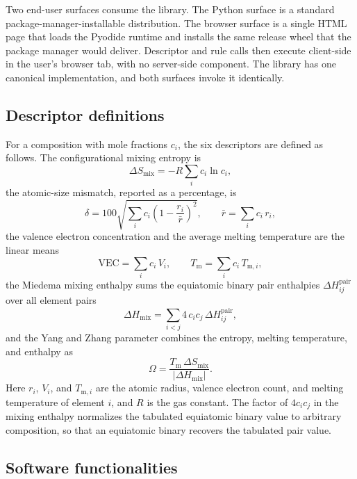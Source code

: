 \documentclass[review,times,nonatbib]{elsarticle}
\newcommand{\Smix}{\ensuremath{\Delta S_{\mathrm{mix}}}}
\newcommand{\Hmix}{\ensuremath{\Delta H_{\mathrm{mix}}}}
\newcommand{\Tm}{\ensuremath{T_{\mathrm{m}}}}
\newcommand{\Omegaparam}{\ensuremath{\Omega}}
\begin{document}
Two end-user surfaces consume the library. The Python surface is a
standard package-manager-installable distribution. The browser
surface is a single HTML page that loads the Pyodide runtime
\cite{pyodide} and installs the same release wheel that
the package manager would deliver. Descriptor and rule calls then
execute client-side in the user's browser tab, with no server-side
component. The library has one canonical implementation, and both
surfaces invoke it identically.

\subsection{Descriptor definitions}

For a composition with mole fractions $c_i$, the six descriptors are
defined as follows. The configurational mixing entropy is
\begin{equation}
\Smix = -R \sum_i c_i \ln c_i ,
\end{equation}
the atomic-size mismatch, reported as a percentage, is
\begin{equation}
\delta = 100 \sqrt{ \sum_i c_i \left( 1 - \frac{r_i}{\bar r} \right)^{2} } ,
\qquad \bar r = \sum_i c_i\, r_i ,
\end{equation}
the valence electron concentration and the average melting
temperature are the linear means
\begin{equation}
\mathrm{VEC} = \sum_i c_i\, V_i ,
\qquad
\Tm = \sum_i c_i\, T_{\mathrm{m},i} ,
\end{equation}
the Miedema mixing enthalpy sums the equiatomic binary pair
enthalpies $\Delta H^{\mathrm{pair}}_{ij}$ over all element pairs
\begin{equation}
\Hmix = \sum_{i<j} 4\, c_i c_j\, \Delta H^{\mathrm{pair}}_{ij} ,
\end{equation}
and the Yang and Zhang parameter combines the entropy, melting
temperature, and enthalpy as
\begin{equation}
\Omegaparam = \frac{ \Tm \, \Smix }{ \lvert \Hmix \rvert } .
\end{equation}
Here $r_i$, $V_i$, and $T_{\mathrm{m},i}$ are the atomic radius,
valence electron count, and melting temperature of element $i$, and
$R$ is the gas constant. The factor of $4 c_i c_j$ in the mixing
enthalpy normalizes the tabulated equiatomic binary value to
arbitrary composition, so that an equiatomic binary recovers the
tabulated pair value.

\subsection{Software functionalities}
\end{document}
